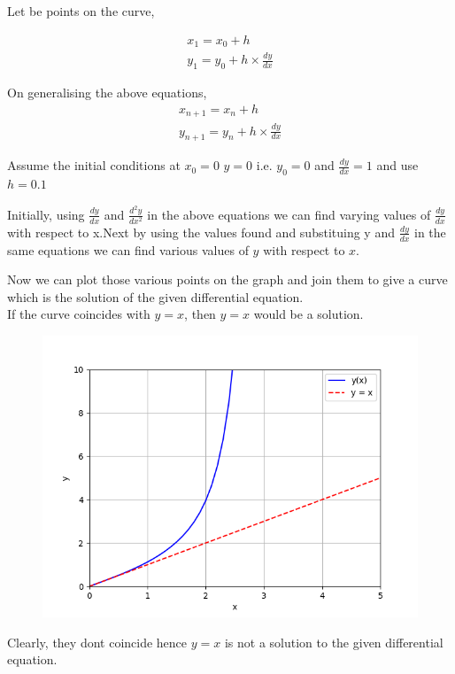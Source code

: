 \documentclass[journal]{IEEEtran}
\begin{document}
Let  be points on the curve,

\begin{align}
x_1=x_0+h \\
y_1=y_0+h \times \frac{dy}{dx} 
\end{align}

On  generalising the above equations,
\begin{align}
x_{n+1}=x_{n}+h \\
y_{n+1}=y_{n}+h \times \frac{dy}{dx}
\end{align}


Assume the initial conditions at $x_0=0$ $y=0$ i.e. $y_0=0$ and $\frac{dy}{dx}=1$ and use $h=0.1$

Initially, using $\frac{dy}{dx}$ and $\frac{d^2y}{dx^2}$ in the above equations we can find varying values of $\frac{dy}{dx}$ with respect to x.Next by using the values found and substituing y and $\frac{dy}{dx}$ in the same equations we can find various values of $y$ with respect to $x$.


Now we can plot those various points on the graph and join them to give a curve which is the solution of the given differential equation.\\

If the curve coincides with $y=x$, then $y=x$ would be a solution.

\begin{figure}[ht]
	\centering
	\includegraphics[width=1\textwidth]{figs/fig.png}
	\label{fig:Plot1}
\end{figure}

Clearly, they dont coincide hence $y=x$ is not a solution to the given differential equation.
\end{document}
